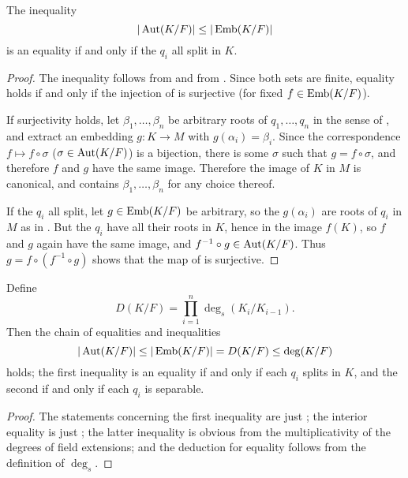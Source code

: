 \begin{proposition} The inequality
\begin{equation*}
|\operatorname{\text{Aut}}(K/F)| \leq |\operatorname{\text{Emb}}(K/F)|
\end{equation*}
is an equality if and only if the $q_i$ all split in $K$.
\label{aut_ineq}
\end{proposition}

\begin{proof} The inequality follows from  and from .
Since both sets are finite, equality holds if and only if the injection of
 is surjective (for fixed $f \in \operatorname{\text{Emb}}(K/F)$).

If surjectivity holds, let $\beta_1, \dots, \beta_n$ be arbitrary roots of
$q_1, \dots, q_n$ in the sense of , and extract an embedding $g
\colon K \to M$ with $g(\alpha_i) = \beta_i$.  Since the correspondence $f
\mapsto f \circ \sigma$ ($\sigma \in \operatorname{\text{Aut}}(K/F)$) is a bijection, there is some
$\sigma$ such that $g = f \circ \sigma$, and therefore $f$ and $g$ have the
same image.  Therefore the image of $K$ in $M$ is canonical, and contains
$\beta_1, \dots, \beta_n$ for any choice thereof.

If the $q_i$ all split, let $g \in \operatorname{\text{Emb}}(K/F)$ be arbitrary, so the
$g(\alpha_i)$ are roots of $q_i$ in $M$ as in .  But the $q_i$
have all their roots in $K$, hence in the image $f(K)$, so $f$ and $g$ again
have the same image, and $f^{-1} \circ g \in \operatorname{\text{Aut}}(K/F)$.  Thus $g = f \circ
(f^{-1} \circ g)$ shows that the map of  is surjective.
\end{proof}

\begin{corollary} Define
\begin{equation*}
D(K/F) = \prod_{i = 1}^n \deg_s(K_i/K_{i - 1}).
\end{equation*}
Then the chain of equalities and inequalities
\begin{equation*}
|\operatorname{\text{Aut}}(K/F)| \leq |\operatorname{\text{Emb}}(K/F)| = D(K/F) \leq \deg(K/F)
\end{equation*}
holds; the first inequality is an equality if and only if each $q_i$ splits in
$K$, and the second if and only if each $q_i$ is separable.
\label{large_aut_ineq}
\end{corollary}

\begin{proof} The statements concerning the first inequality are just
; the interior equality is just ; the latter
inequality is obvious from the multiplicativity of the degrees of field
extensions; and the deduction for equality follows from the definition of
$\deg_s$. \end{proof}

